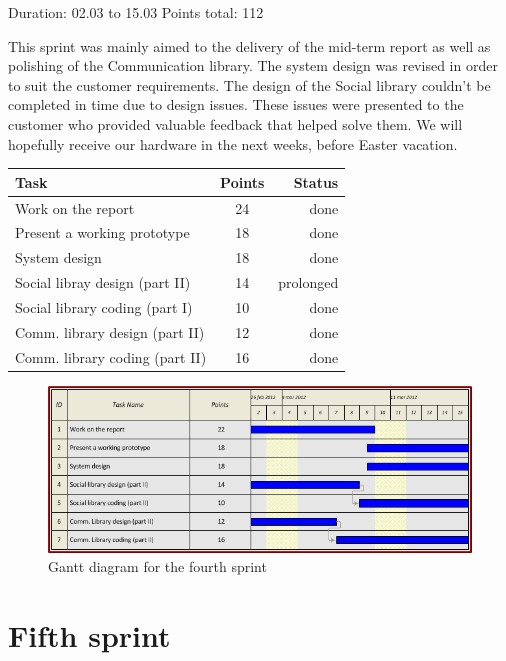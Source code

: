 Duration: 02.03 to 15.03
Points total: 112

This sprint was mainly aimed to the delivery of the mid-term report as well
as polishing of the Communication library. The system design was revised in
order to suit the customer requirements. The design of the Social library couldn't
be completed in time due to design issues. These issues were presented to the
customer who provided valuable feedback that helped solve them.
We will hopefully receive our hardware in the next weeks, before Easter vacation.

\begin{table}[ht!]
\begin{tabular}{ | l | c | r | }

\hline
\textbf{Task} & \textbf{Points} & \textbf{Status} \\
\hline

Work on the report			& 24 & done \\
\hline
Present a working prototype		& 18 & done \\
\hline
System design				& 18 & done \\
\hline
Social libray design (part II)		& 14 & prolonged \\
\hline
Social library coding (part I)		& 10 & done \\
\hline
Comm. library design (part II)		& 12 & done \\
\hline
Comm. library coding (part II)		& 16 & done \\
\hline

\end{tabular}
\end{table}

\begin{figure}[h!]
\centering \includegraphics[scale=0.8]{img/sprints-gantt4.png}
\caption{Gantt diagram for the fourth sprint}
\label{fig:sprints-gantt4}
\end{figure}

\newpage

\section{Fifth sprint}

